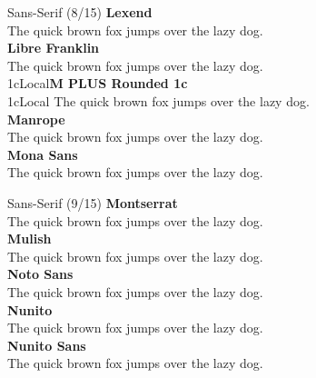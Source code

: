 \documentclass[10pt]{beamer}
\begin{document}
\begin{frame}{Sans-Serif (8/15)}
\vspace{-0.2cm}
  {\LexendLocal\Large\bfseries Lexend\\}
  {\LexendLocal The quick brown fox jumps over the lazy dog.\\[0.3cm]}
  {\LibreFranklinLocal\Large\bfseries Libre Franklin\\}
  {\LibreFranklinLocal The quick brown fox jumps over the lazy dog.\\[0.3cm]}
  {\MPLUSRounded1cLocal\Large\bfseries M PLUS Rounded 1c\\}
  {\MPLUSRounded1cLocal The quick brown fox jumps over the lazy dog.\\[0.3cm]}
  {\ManropeLocal\Large\bfseries Manrope\\}
  {\ManropeLocal The quick brown fox jumps over the lazy dog.\\[0.3cm]}
  {\MonaSansLocal\Large\bfseries Mona Sans\\}
  {\MonaSansLocal The quick brown fox jumps over the lazy dog.\\[0.3cm]}
\end{frame}

\begin{frame}{Sans-Serif (9/15)}
\vspace{-0.2cm}
  {\MontserratLocal\Large\bfseries Montserrat\\}
  {\MontserratLocal The quick brown fox jumps over the lazy dog.\\[0.3cm]}
  {\MulishLocal\Large\bfseries Mulish\\}
  {\MulishLocal The quick brown fox jumps over the lazy dog.\\[0.3cm]}
  {\NotoSansLocal\Large\bfseries Noto Sans\\}
  {\NotoSansLocal The quick brown fox jumps over the lazy dog.\\[0.3cm]}
  {\NunitoLocal\Large\bfseries Nunito\\}
  {\NunitoLocal The quick brown fox jumps over the lazy dog.\\[0.3cm]}
  {\NunitoSansLocal\Large\bfseries Nunito Sans\\}
  {\NunitoSansLocal The quick brown fox jumps over the lazy dog.\\[0.3cm]}
\end{frame}
\end{document}
